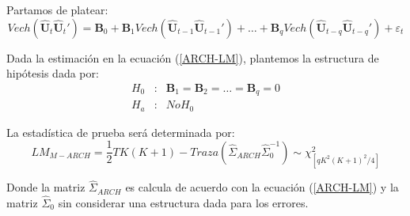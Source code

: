 \documentclass[
  a4paper,
]{article}
\begin{document}
Partamos de platear: \[
    Vech(\hat{\mathbf{U}}_t \hat{\mathbf{U}}_t') = \mathbf{B}_0 + \mathbf{B}_1 Vech(\hat{\mathbf{U}}_{t-1} \hat{\mathbf{U}}_{t-1}') + \ldots + \mathbf{B}_q Vech(\hat{\mathbf{U}}_{t-q} \hat{\mathbf{U}}_{t-q}') + \varepsilon_t
    \label{ARCH-LM}
\]

Dada la estimación en la ecuación (\ref{ARCH-LM}), plantemos la
estructura de hipótesis dada por: \begin{eqnarray*}
    H_0 & : & \mathbf{B}_1 = \mathbf{B}_2 = \ldots = \mathbf{B}_q = 0 \\
    H_a & : & No H_0    
\end{eqnarray*}

La estadística de prueba será determinada por: \[
    LM_{M-ARCH} = \frac{1}{2} T K (K + 1) - Traza \left( \hat{\Sigma}_{ARCH} \hat{\Sigma}^{-1}_{0} \right) \sim \chi^2_{[q K^2 (K + 1)^2 / 4]}
\]

Donde la matriz \(\hat{\Sigma}_{ARCH}\) es calcula de acuerdo con la
ecuación (\ref{ARCH-LM}) y la matriz \(\hat{\Sigma}_{0}\) sin considerar
una estructura dada para los errores.


\printbibliography
\end{document}
